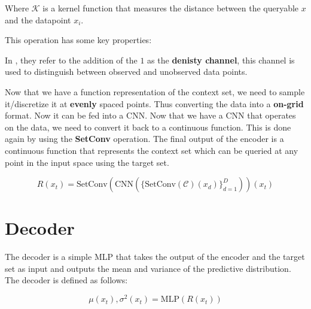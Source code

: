 \documentclass[../../main.tex]{subfiles}
\begin{document}
Where $\mathcal{K}$ is a kernel function that measures the distance between the queryable $x$ and the datapoint $x_i$.

This operation has some key properties:

In \cite{gordon2020convolutional}, they refer to the addition of the $1$ as the \textbf{denisty channel}, this channel is used to distinguish between observed and unobserved data points. 

Now that we have a function representation of the context set, we need to sample it/discretize it at \textbf{evenly} spaced points. Thus converting the data into a \textbf{on-grid} format. Now it can be fed into a CNN. Now that we have a CNN that operates on the data, we need to convert it back to a continuous function. This is done again by using the \textbf{SetConv} operation. The final output of the encoder is a continuous function that represents the context set which can be queried at any point in the input space using the target set.

\begin{equation}
	R(x_t) = \text{SetConv}(\text{CNN}(\{\text{SetConv}(\mathcal{C})(x_d)\}_{d=1}^{D}))(x_t)
\end{equation}

\section{Decoder}

The decoder is a simple MLP that takes the output of the encoder and the target set as input and outputs the mean and variance of the predictive distribution. The decoder is defined as follows:

\begin{equation}
	\mu(x_t), \sigma^2(x_t) = \text{MLP}(R(x_t))
\end{equation}


\ifSubfilesClassLoaded{%
    \printbibliography{}
}{} 
\end{document}
